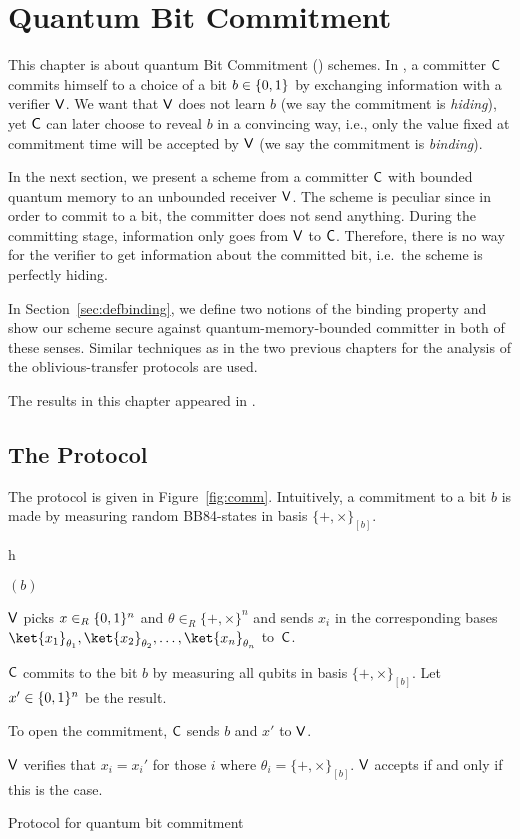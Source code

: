 \chapter{Quantum Bit Commitment} \label{chap:qbc}
This chapter is about quantum Bit Commitment (\BC) schemes. In \BC, a
committer ${\sf C}$ commits himself to a choice of a bit $b \in \{0,1\}$
by exchanging information with a verifier ${\sf V}$. We want that ${\sf V}$ does
not learn $b$ (we say the commitment is \emph{hiding}), yet ${\sf C}$ can later
choose to reveal $b$ in a convincing way, i.e., only the value fixed at
commitment time will be accepted by ${\sf V}$ (we say the commitment is
\emph{binding}).

In the next section, we present a \BC scheme from a committer ${\sf C}$ with
bounded quantum memory to an unbounded receiver ${\sf V}$. The scheme is
peculiar since in order to commit to a bit, the committer does not
send anything. During the committing stage, information only goes from
${\sf V}$ to ${\sf C}$.  Therefore, there is no way for the verifier to get
information about the committed bit, i.e.~the scheme is perfectly
hiding.

In Section~\ref{sec:defbinding}, we define two notions of the binding
property and show our scheme secure against quantum-memory-bounded
committer in both of these senses. Similar techniques as in the two previous
chapters for the analysis of the oblivious-transfer protocols are
used.

The results in this chapter appeared in \cite{DFSS05, DFRSS07}.

\section{The Protocol} \label{sec:commprotocol}
The protocol is given in Figure~\ref{fig:comm}. Intuitively, a
commitment to a bit $b$ is made by measuring random BB84-states in
basis $\{+,\times\}_{[b]}$.
  
\begin{myfigure}{h}
\begin{myprotocol}{\comm$(b)$}
\item ${\sf V}$ picks $x \in_R \{0,1\}^n$ and $\theta \in_R \{+,\times \}^n$ and
  sends $x_i$ in the corresponding bases $\ket{x_1}_{\theta_1},
  \ket{x_2}_{\theta_2}, \ldots, \ket{x_n}_{\theta_n}$ to~${\sf C}$.
 \item ${\sf C}$ commits to the bit $b$ by measuring all qubits in basis
   $\{+,\times \}_{[b]}$. Let $x' \in \{0,1\}^n$ be the result.
 \item\label{step:open} To open the commitment, ${\sf C}$ sends $b$ and $x'$ to ${\sf V}$.
 \item ${\sf V}$ verifies that $x_i= x_i'$ for those $i$ where $\theta_i =
   \{+,\times \}_{[b]}$. ${\sf V}$ accepts if and only if this is the case.
\end{myprotocol}
\caption{Protocol for quantum bit commitment}\label{fig:comm}
\end{myfigure}


